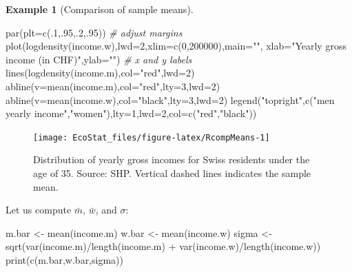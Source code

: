 \documentclass[
  12pt,
]{book}
\newenvironment{Shaded}{\begin{snugshade}}{\end{snugshade}}
\newcommand{\AttributeTok}[1]{\textcolor[rgb]{0.77,0.63,0.00}{#1}}
\newcommand{\CommentTok}[1]{\textcolor[rgb]{0.56,0.35,0.01}{\textit{#1}}}
\newcommand{\DecValTok}[1]{\textcolor[rgb]{0.00,0.00,0.81}{#1}}
\newcommand{\FunctionTok}[1]{\textcolor[rgb]{0.00,0.00,0.00}{#1}}
\newcommand{\NormalTok}[1]{#1}
\newcommand{\OtherTok}[1]{\textcolor[rgb]{0.56,0.35,0.01}{#1}}
\newcommand{\SpecialCharTok}[1]{\textcolor[rgb]{0.00,0.00,0.00}{#1}}
\newcommand{\StringTok}[1]{\textcolor[rgb]{0.31,0.60,0.02}{#1}}
\theoremstyle{definition}
\theoremstyle{definition}
\newtheorem{example}{Example}[chapter]
\theoremstyle{definition}
\theoremstyle{definition}
\theoremstyle{remark}
\begin{document}
\begin{example}[Comparison of sample means]
\begin{Shaded}
\begin{Highlighting}[]
\FunctionTok{par}\NormalTok{(}\AttributeTok{plt=}\FunctionTok{c}\NormalTok{(.}\DecValTok{1}\NormalTok{,.}\DecValTok{95}\NormalTok{,.}\DecValTok{2}\NormalTok{,.}\DecValTok{95}\NormalTok{)) }\CommentTok{\# adjust margins}
\FunctionTok{plot}\NormalTok{(}\FunctionTok{logdensity}\NormalTok{(income.w),}\AttributeTok{lwd=}\DecValTok{2}\NormalTok{,}\AttributeTok{xlim=}\FunctionTok{c}\NormalTok{(}\DecValTok{0}\NormalTok{,}\DecValTok{200000}\NormalTok{),}\AttributeTok{main=}\StringTok{""}\NormalTok{,}
     \AttributeTok{xlab=}\StringTok{"Yearly gross income (in CHF)"}\NormalTok{,}\AttributeTok{ylab=}\StringTok{""}\NormalTok{) }\CommentTok{\# x and y labels}
\FunctionTok{lines}\NormalTok{(}\FunctionTok{logdensity}\NormalTok{(income.m),}\AttributeTok{col=}\StringTok{"red"}\NormalTok{,}\AttributeTok{lwd=}\DecValTok{2}\NormalTok{)}
\FunctionTok{abline}\NormalTok{(}\AttributeTok{v=}\FunctionTok{mean}\NormalTok{(income.m),}\AttributeTok{col=}\StringTok{"red"}\NormalTok{,}\AttributeTok{lty=}\DecValTok{3}\NormalTok{,}\AttributeTok{lwd=}\DecValTok{2}\NormalTok{)}
\FunctionTok{abline}\NormalTok{(}\AttributeTok{v=}\FunctionTok{mean}\NormalTok{(income.w),}\AttributeTok{col=}\StringTok{"black"}\NormalTok{,}\AttributeTok{lty=}\DecValTok{3}\NormalTok{,}\AttributeTok{lwd=}\DecValTok{2}\NormalTok{)}
\FunctionTok{legend}\NormalTok{(}\StringTok{"topright"}\NormalTok{,}\FunctionTok{c}\NormalTok{(}\StringTok{"men yearly income"}\NormalTok{,}\StringTok{"women"}\NormalTok{),}\AttributeTok{lty=}\DecValTok{1}\NormalTok{,}\AttributeTok{lwd=}\DecValTok{2}\NormalTok{,}\AttributeTok{col=}\FunctionTok{c}\NormalTok{(}\StringTok{"red"}\NormalTok{,}\StringTok{"black"}\NormalTok{))}
\end{Highlighting}
\end{Shaded}

\begin{figure}
\texttt{[image: EcoStat\_files/figure-latex/RcompMeans-1]} \caption{Distribution of yearly gross incomes for Swiss residents under the age of 35. Source: SHP. Vertical dashed lines indicates the sample mean.}\label{fig:RcompMeans}
\end{figure}

Let us compute \(\bar{m}\), \(\bar{w}\), and \(\sigma\):

\begin{Shaded}
\begin{Highlighting}[]
\NormalTok{m.bar }\OtherTok{\textless{}{-}} \FunctionTok{mean}\NormalTok{(income.m)}
\NormalTok{w.bar }\OtherTok{\textless{}{-}} \FunctionTok{mean}\NormalTok{(income.w)}
\NormalTok{sigma }\OtherTok{\textless{}{-}} \FunctionTok{sqrt}\NormalTok{(}\FunctionTok{var}\NormalTok{(income.m)}\SpecialCharTok{/}\FunctionTok{length}\NormalTok{(income.m) }\SpecialCharTok{+} \FunctionTok{var}\NormalTok{(income.w)}\SpecialCharTok{/}\FunctionTok{length}\NormalTok{(income.w))}
\FunctionTok{print}\NormalTok{(}\FunctionTok{c}\NormalTok{(m.bar,w.bar,sigma))}
\end{Highlighting}
\end{Shaded}


\end{example}
\end{document}
